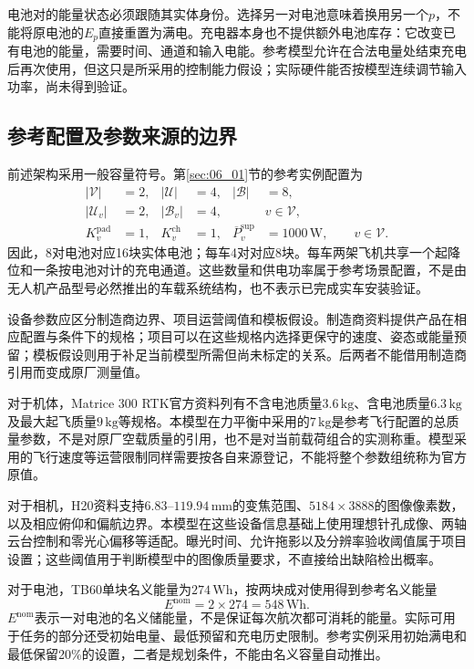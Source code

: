 电池对的能量状态必须跟随其实体身份。选择另一对电池意味着换用另一个$p$，不能将原电池的$E_p$直接重置为满电。充电器本身也不提供额外电池库存：它改变已有电池的能量，需要时间、通道和输入电能。参考模型允许在合法电量处结束充电后再次使用，但这只是所采用的控制能力假设；实际硬件能否按模型连续调节输入功率，尚未得到验证。

\subsection{参考配置及参数来源的边界}

前述架构采用一般容量符号。第\ref{sec:06_01}节的参考实例配置为
\begin{align}
 |\mathcal V|&=2, &|\mathcal U|&=4, &|\mathcal B|&=8,
 \label{s0402:reference_fleet}\\
 |\mathcal U_v|&=2, &|\mathcal B_v|&=4,
 &&v\in\mathcal V,
 \label{s0402:reference_inventory}\\
 K_v^{\mathrm{pad}}&=1, &K_v^{\mathrm{ch}}&=1,
 &\overline P_v^{\mathrm{sup}}&=1000\,\mathrm W,
 \qquad v\in\mathcal V.
 \label{s0402:reference_services}
\end{align}
因此，8对电池对应16块实体电池；每车4对对应8块。每车两架飞机共享一个起降位和一条按电池对计的充电通道。这些数量和供电功率属于参考场景配置，不是由无人机产品型号必然推出的车载系统结构，也不表示已完成实车安装验证。

设备参数应区分制造商边界、项目运营阈值和模板假设。制造商资料提供产品在相应配置与条件下的规格；项目可以在这些规格内选择更保守的速度、姿态或能量预留；模板假设则用于补足当前模型所需但尚未标定的关系。后两者不能借用制造商引用而变成原厂测量值。

对于机体，Matrice 300 RTK官方资料列有不含电池质量$3.6\,\mathrm{kg}$、含电池质量$6.3\,\mathrm{kg}$及最大起飞质量$9\,\mathrm{kg}$等规格\cite{DJIM300}。本模型在力平衡中采用的$7\,\mathrm{kg}$是参考飞行配置的总质量参数，不是对原厂空载质量的引用，也不是对当前载荷组合的实测称重。模型采用的飞行速度等运营限制同样需要按各自来源登记，不能将整个参数组统称为官方原值。

对于相机，H20资料支持$6.83$--$119.94\,\mathrm{mm}$的变焦范围、$5184\times3888$的图像像素数，以及相应俯仰和偏航边界\cite{DJIH20}。本模型在这些设备信息基础上使用理想针孔成像、两轴云台控制和零光心偏移等适配。曝光时间、允许拖影以及分辨率验收阈值属于项目设置；这些阈值用于判断模型中的图像质量要求，不直接给出缺陷检出概率。

对于电池，TB60单块名义能量为$274\,\mathrm{Wh}$，按两块成对使用得到参考名义能量
\begin{equation}
 E^{\mathrm{nom}}=2\times274=548\,\mathrm{Wh}.
 \label{s0402:nominal_pair_energy}
\end{equation}
$E^{\mathrm{nom}}$表示一对电池的名义储能量，不是保证每次航次都可消耗的能量\cite{DJITB60}。实际可用于任务的部分还受初始电量、最低预留和充电历史限制。参考实例采用初始满电和最低保留20\%的设置，二者是规划条件，不能由名义容量自动推出。

